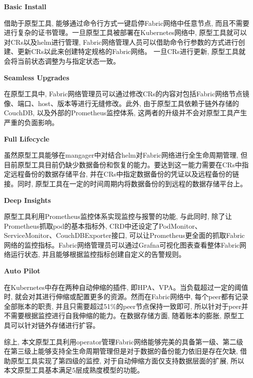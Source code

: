 \textbf{Basic Install}

借助于原型工具, 能够通过命令行方式一键启停Fabric网络中任意节点, 而且不需要进行复杂的证书管理。一旦原型工具被部署在Kubernetes网络中, 原型工具就可以对CRs以及helm进行管理, Fabric网络管理人员可以借助命令行参数的方式进行创建、更新CRs以此来创建特定规格的Fabric网络。 一旦CRs进行更新, 原型工具就会将当前状态调整为与指定状态一致。

\textbf{Seamless Upgrades}

在原型工具中, Fabric网络管理员可以通过修改CRs的内容对包括Fabric网络节点镜像、端口、host、版本等进行无缝修改。此外, 由于原型工具依赖于链外存储的CouchDB, 以及外部的Prometheus监控体系, 这两者的升级并不会对原型工具产生严重的负面影响。 

\textbf{Full Lifecycle}

虽然原型工具能够在mangager中对结合helm对Fabric网络进行全生命周期管理, 但目前原型工具目前仍缺少数据备份和恢复的能力。要达到这一能力需要在CRs中指定远程备份的数据存储平台, 并在CRs中指定数据备份的凭证以及远程备份的链接。同时, 原型工具在一定的时间周期内将数据备份的到远程的数据存储平台上。

\textbf{Deep Insights}

原型工具利用Prometheus监控体系实现监控与报警的功能, 与此同时, 除了让Prometheus抓取pod的基本指标外, CRD中还设定了PodMonitor、ServiceMonitor、CouchDBExporter接口, 可以让Prometheus更全面的抓取Fabric网络的监控指标。Fabric网络管理员可以通过Grafna可视化图表查看整体Fabric网络运行状态, 并且能够根据监控指标创建自定义的告警规则。

\textbf{Auto Pilot}

在Kubernetes中存在两种自动伸缩的插件, 即HPA、VPA。当负载超过一定的阈值时, 就会对其进行伸缩或配置更多的资源。然而在Fabric网络中, 每个peer都有记录全部账本的职责, 并且只需要超过51\%的peer节点保持一致即可, 所以针对于peer并不需要根据监控进行自我伸缩的能力。在数据存储方面, 随着账本的膨胀, 原型工具可以针对链外存储进行扩容。

综上, 本文原型工具利用operator管理Fabric网络能够完美的具备第一级、第二级在第三级上能够支持全生命周期管理但是对于数据的备份能力依旧是存在欠缺, 借助原型工具实现了第四级的监控, 对于自动伸缩方面仅支持数据层面的扩展, 所以本文原型工具基本满足5层成熟度模型的功能。

